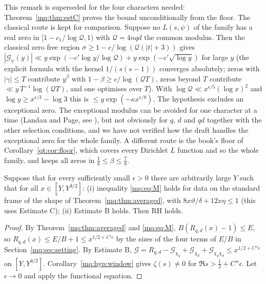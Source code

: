 \begin{remark}\label{mq:rem:C}
This remark is superseded for the four characters needed: Theorem~\ref{mq:thm:estC} proves the bound unconditionally from the floor. The classical route is kept for comparison. Suppose no $L(s,\psi)$ of the family has a real zero in $[1-c_1/\log\mathcal Q,1)$ with $\mathcal Q=4nqd$ the common modulus. Then the classical zero free region $\sigma\ge1-c/\log(\mathcal Q(|t|+3))$ gives $|\mathcal G_\psi(y)|\ll y\exp(-c'\log y/\log\mathcal Q)+y\exp(-c'\sqrt{\log y})$ for large $y$ (the explicit formula with the kernel $1/(s(s-1))$ converges absolutely; zeros with $|\gamma|\le T$ contribute $y^\beta$ with $1-\beta\ge c/\log(\mathcal QT)$, zeros beyond $T$ contribute $\ll y\,T^{-1}\log(\mathcal QT)$, and one optimises over $T$). With $\log\mathcal Q\ll x^{\epsilon/5}(\log x)^2$ and $\log y\ge x^{\epsilon/3}-\log3$ this is $\le y\exp(-\kappa x^{\epsilon/8})$. The hypothesis excludes an exceptional zero. The exceptional modulus can be avoided for one character at a time (Landau and Page, see \cite{Davenport}), but not obviously for $q$, $d$ and $qd$ together with the other selection conditions, and we have not verified how the draft handles the exceptional zero for the whole family. A different route is the book's floor of Corollary~\ref{qt:cor:floor}, which covers every Dirichlet $L$ function and so the whole family, and keeps all zeros in $\frac18\le\beta\le\frac78$.
\end{remark}

\begin{theorem}\label{mq:thm:chain}
Suppose that for every sufficiently small $\epsilon>0$ there are arbitrarily large $Y$ such that for all $x\in[Y,Y^{3/2}]$: (i) inequality \eqref{mq:eq:M} holds for data on the standard frame of the shape of Theorem~\ref{mq:thm:averaged}, with $8x\vartheta/\delta+12x\eta\le1$ (this uses Estimate C); (ii) Estimate B holds. Then RH holds.
\end{theorem}

\begin{proof}
By Theorem~\ref{mq:thm:averaged} and \eqref{mq:eq:M}, $B(R_{q,d}(x)-1)\le E$, so $R_{q,d}(x)\le E/B+1\le x^{1/2+C'\epsilon}$ by the sizes of the four terms of $E/B$ in Section~\ref{mq:sec:setting}. By Estimate B, $\mathcal G=R_{q,d}-\mathcal G_{\chi_q}+\mathcal G_{\chi_d}+\mathcal G_{\chi_q\chi_d}\le x^{1/2+C''\epsilon}$ on $[Y,Y^{3/2}]$. Corollary~\ref{mq:hyp:window} gives $\zeta(s)\ne0$ for $\Re s>\frac12+C''\epsilon$. Let $\epsilon\to0$ and apply the functional equation.
\end{proof}

